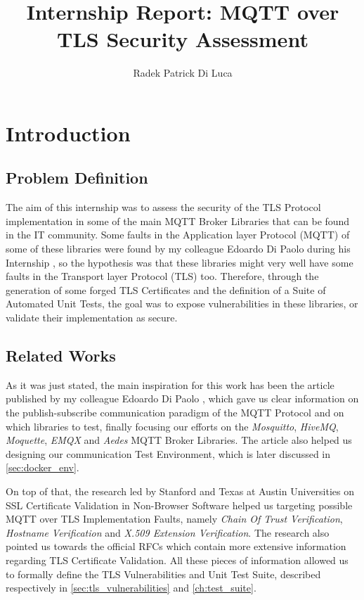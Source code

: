 \documentclass[binding=0.6cm,noexaminfo]{sapthesis}
\title{Internship Report: MQTT over TLS Security Assessment} \author{Radek Patrick Di Luca}
\begin{document}
\frontmatter
\maketitle
\tableofcontents
\mainmatter
\chapter{Introduction}
\section{Problem Definition}
The aim of this internship was to assess the security of the TLS Protocol implementation in some of the main MQTT Broker Libraries that can be found in the IT community. Some faults in the Application layer Protocol (MQTT) of some of these libraries were found by my colleague Edoardo Di Paolo during his Internship \cite{mqttpaper}, so the hypothesis was that these libraries might very well have some faults in the Transport layer Protocol (TLS) too.
Therefore, through the generation of some forged TLS Certificates and the definition of a Suite of Automated Unit Tests, the goal was to expose vulnerabilities in these libraries, or validate their implementation as secure.

\section{Related Works}
As it was just stated, the main inspiration for this work has been the article published by my colleague Edoardo Di Paolo \cite{mqttpaper}, which gave us clear information on the publish-subscribe communication paradigm of the MQTT Protocol and on which libraries to test, finally focusing our efforts on the \textit{Mosquitto}, \textit{HiveMQ}, \textit{Moquette}, \textit{EMQX} and \textit{Aedes} MQTT Broker Libraries. The article \cite{mqttpaper} also helped us designing our communication Test Environment, which is later discussed in \autoref{sec:docker_env}.

On top of that, the research led by Stanford and Texas at Austin Universities on SSL Certificate Validation in Non-Browser Software \cite{sslvalidation} helped us targeting possible MQTT over TLS Implementation Faults, namely \textit{Chain Of Trust Verification}, \textit{Hostname Verification} and \textit{X.509 Extension Verification}. The research \cite{sslvalidation} also pointed us towards the official RFCs \cites{rfc2818}{rfc5280}{rfc8446} which contain more extensive information regarding TLS Certificate Validation. All these pieces of information allowed us to formally define the TLS Vulnerabilities and Unit Test Suite, described respectively in \autoref{sec:tls_vulnerabilities} and \autoref{ch:test_suite}.
\end{document}
